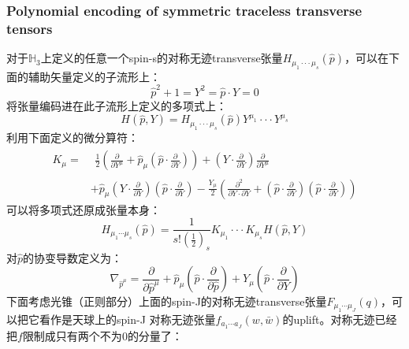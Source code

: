 \subsubsection{Polynomial encoding of symmetric traceless transverse tensors}
对于$\mathbb{H}_3$上定义的任意一个spin\mbox{-s}的对称无迹transverse张量$H_{\mu_1\cdot\cdot\cdot\mu_s}(\hat{p})$，可以在下面的辅助矢量定义的子流形上：
\[\hat{p}^2+1=Y^2=\hat{p}\cdot Y=0\]
将张量编码进在此子流形上定义的多项式上：
\begin{equation}
	H(\hat{p},Y)=H_{\mu_1\cdot\cdot\cdot\mu_s}(\hat{p})Y^{\mu_1}\cdotp\cdotp\cdotp Y^{\mu_s}
\end{equation}
利用下面定义的微分算符：\sn{\[K_{\mu}K_{\nu}=K_{\nu}K_{\mu},\hat{p}^{\mu}K_{\mu}=0,K_{\mu}K^{\mu}=0\]}
\begin{equation}
	\begin{aligned}
		K_{\mu}=& \begin{aligned}\frac{1}{2}\left(\frac{\partial}{\partial Y^{\mu}}+\hat{p}_{\mu}\left(\hat{p}\cdot\frac{\partial}{\partial Y}\right)\right)+\left(Y\cdot\frac{\partial}{\partial Y}\right)\frac{\partial}{\partial Y^{\mu}}\end{aligned}  \\
		&+\hat{p}_{\mu}\left(Y\cdot\frac{\partial}{\partial Y}\right)\left(\hat{p}\cdot\frac{\partial}{\partial Y}\right)-\frac{Y_{\mu}}{2}\left(\frac{\partial^{2}}{\partial Y\cdot\partial Y}+\left(\hat{p}\cdot\frac{\partial}{\partial Y}\right)\left(\hat{p}\cdot\frac{\partial}{\partial Y}\right)\right)
	\end{aligned}
\end{equation}
可以将多项式还原成张量本身：
\begin{equation}
	H_{\mu_1\cdots\mu_s}(\hat{p})=\frac{1}{s!\left(\frac{1}{2}\right)_s}K_{\mu_1}\cdotp\cdotp\cdotp K_{\mu_s}H(\hat{p},Y)
\end{equation}
对$\hat p$的协变导数定义为：
\begin{equation}
	\nabla_{\hat{p}^{\mu}}=\frac{\partial}{\partial\hat{p}^{\mu}}+\hat{p}_{\mu}\left(\hat{p}\cdot\frac{\partial}{\partial\hat{p}}\right)+Y_{\mu}\left(\hat{p}\cdot\frac{\partial}{\partial Y}\right)
\end{equation}
下面考虑光锥（正则部分）上面的spin\mbox{-}J的对称无迹transverse张量$F_{\mu_{1}\cdots\mu_{J}}(q)$，可以把它看作是天球上的spin\mbox{-}J 对称无迹张量$f_{a_{1}\cdots a_{J}}(w,\bar{w})$的uplift。对称无迹已经把$f$限制成只有两个不为$0$的分量了：
